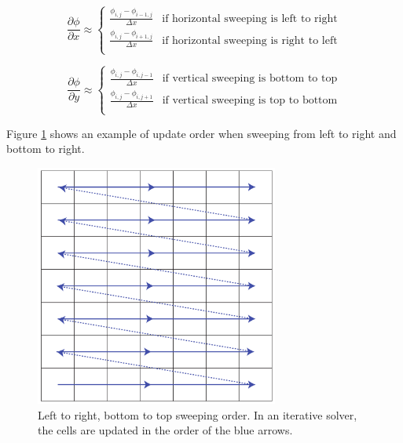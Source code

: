 \begin{equation}
\frac{\partial \phi}{\partial x} \approx
\left\{
\begin{array}{ll}
\frac{\phi_{i,j} - \phi_{i-1,j}}{\Delta x} & \mbox{if horizontal sweeping is left to right} \\
\frac{\phi_{i,j} - \phi_{i+1,j}}{\Delta x} & \mbox{if horizontal sweeping is right to left} \\
\end{array}
\right.
\end{equation}

\begin{equation}
\frac{\partial \phi}{\partial y} \approx
\left\{
\begin{array}{ll}
\frac{\phi_{i,j} - \phi_{i,j-1}}{\Delta x} & \mbox{if vertical sweeping is bottom to top} \\
\frac{\phi_{i,j} - \phi_{i,j+1}}{\Delta x} & \mbox{if vertical sweeping is top to bottom} \\
\end{array}
\right.
\end{equation}

Figure \ref{sweeppic} shows an example of update order when sweeping from left to right and bottom to right.

\begin{figure}[ht!]
\centering
\includegraphics[width=80mm]{img/sweep.pdf}
\caption{Left to right, bottom to top sweeping order. In an iterative solver, the cells are updated in the order of the blue arrows.}
\label{sweeppic}
\end{figure}

